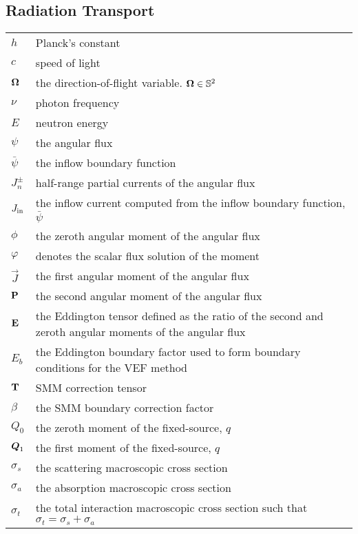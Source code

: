 \documentclass[../doc.tex]{subfiles}
\begin{document}
\subsection*{Radiation Transport}
\begin{longtable}{p{2cm}p{12cm}}
$h$ & Planck's constant \\
$c$ & speed of light \\
$\Omegahat$ & the direction-of-flight variable. $\Omegahat\in \mathbb{S}^2$\\
$\nu$ & photon frequency \\
$E$ & neutron energy \\
$\psi$ & the angular flux \\
$\bar{\psi}$ & the inflow boundary function \\
$J_n^\pm$ & half-range partial currents of the angular flux \\
$\Jin$ & the inflow current computed from the inflow boundary function, $\bar{\psi}$ \\
$\phi$ & the zeroth angular moment of the angular flux \\
$\varphi$ & denotes the scalar flux solution of the moment \\
$\vec{J}$ & the first angular moment of the angular flux \\
$\P$ & the second angular moment of the angular flux \\
$\E$ & the Eddington tensor defined as the ratio of the second and zeroth angular moments of the angular flux \\
$E_b$ & the Eddington boundary factor used to form boundary conditions for the VEF method \\
$\T$ & SMM correction tensor \\
$\beta$ & the SMM boundary correction factor \\
$Q_0$ & the zeroth moment of the fixed-source, $q$ \\
$\Qone$ & the first moment of the fixed-source, $q$ \\
$\sigma_s$ & the scattering macroscopic cross section \\
$\sigma_a$ & the absorption macroscopic cross section \\
$\sigma_t$ & the total interaction macroscopic cross section such that $\sigma_t = \sigma_s + \sigma_a$ \\ 
\end{longtable}
\end{document}
